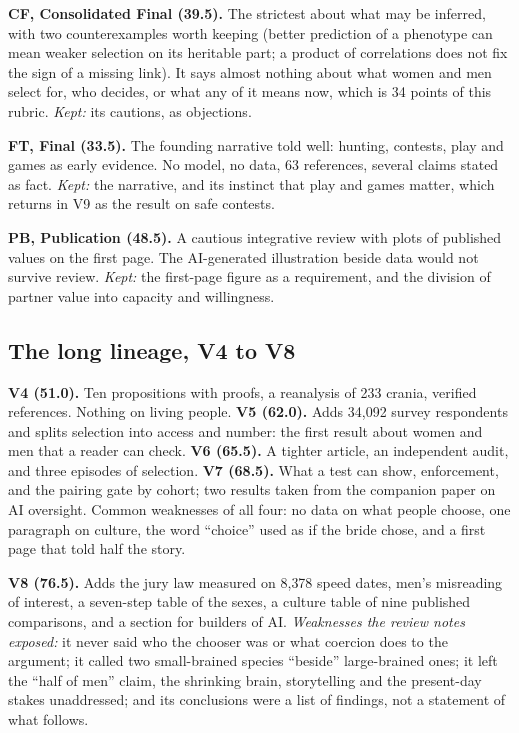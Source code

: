 \documentclass[10pt,letterpaper]{extarticle}
\newcommand{\lab}[1]{\textbf{#1}}
\newcommand{\TotCF}{39.5}
\newcommand{\TotFT}{33.5}
\newcommand{\TotPB}{48.5}
\newcommand{\TotVfour}{51.0}
\newcommand{\TotVfive}{62.0}
\newcommand{\TotVsix}{65.5}
\newcommand{\TotVseven}{68.5}
\newcommand{\TotVeight}{76.5}
\begin{document}
\lab{CF, Consolidated Final (\TotCF).} The strictest about what may be inferred, with two counterexamples worth keeping
(better prediction of a phenotype can mean weaker selection on its heritable part; a product of correlations does not fix
the sign of a missing link). It says almost nothing about what women and men select for, who decides, or what any of it
means now, which is 34 points of this rubric. \emph{Kept:} its cautions, as objections.

\lab{FT, Final (\TotFT).} The founding narrative told well: hunting, contests, play and games as early evidence. No model,
no data, 63 references, several claims stated as fact. \emph{Kept:} the narrative, and its instinct that play and games
matter, which returns in V9 as the result on safe contests.

\lab{PB, Publication (\TotPB).} A cautious integrative review with plots of published values on the first page. The
AI-generated illustration beside data would not survive review. \emph{Kept:} the first-page figure as a requirement, and the
division of partner value into capacity and willingness.

\subsection*{The long lineage, V4 to V8}
\lab{V4 (\TotVfour).} Ten propositions with proofs, a reanalysis of 233 crania, verified references. Nothing on living
people. \lab{V5 (\TotVfive).} Adds 34{,}092 survey respondents and splits selection into access and number: the first result
about women and men that a reader can check. \lab{V6 (\TotVsix).} A tighter article, an independent audit, and three episodes of
selection. \lab{V7 (\TotVseven).} What a test can show, enforcement, and the pairing gate by cohort; two results taken from the
companion paper on AI oversight. Common weaknesses of all four: no data on what people choose, one paragraph on culture,
the word ``choice'' used as if the bride chose, and a first page that told half the story.

\lab{V8 (\TotVeight).} Adds the jury law measured on 8{,}378 speed dates, men's misreading of interest, a seven-step table of
the sexes, a culture table of nine published comparisons, and a section for builders of AI. \emph{Weaknesses the review
notes exposed:} it never said who the chooser was or what coercion does to the argument; it called two small-brained
species ``beside'' large-brained ones; it left the ``half of men'' claim, the shrinking brain, storytelling and the
present-day stakes unaddressed; and its conclusions were a list of findings, not a statement of what follows.
\end{document}
